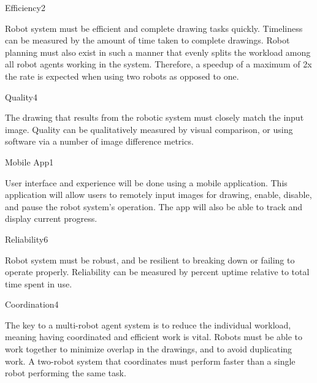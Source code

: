 \begin{nonfunctional_requirement}{Efficiency}{2}
\label{nfr:efficiency}
\item Robot system must be efficient and complete drawing tasks quickly. Timeliness can be measured by the amount of time taken to complete drawings. Robot planning must also exist in such a manner that evenly splits the workload among all robot agents working in the system. Therefore, a speedup of a maximum of 2x the rate is expected when using two robots as opposed to one. 
\end{nonfunctional_requirement}

\begin{nonfunctional_requirement}{Quality}{4}
\label{nfr:quality}
\item The drawing that results from the robotic system must closely match the input image. Quality can be qualitatively measured by visual comparison, or using software via a number of image difference metrics.
\end{nonfunctional_requirement}

\begin{nonfunctional_requirement}{Mobile App}{1}
\label{nfr:mobileapp}
\item User interface and experience will be done using a mobile application. This application will allow users to remotely input images for drawing, enable, disable, and pause the robot system's operation. The app will also be able to track and display current progress.
\end{nonfunctional_requirement}

\begin{nonfunctional_requirement}{Reliability}{6}
\label{nfr:reliability}
\item Robot system must be robust, and be resilient to breaking down or failing to operate properly. Reliability can be measured by percent uptime relative to total time spent in use.
\end{nonfunctional_requirement}


\begin{nonfunctional_requirement}{Coordination}{4}
\label{nfr:coordination}
\item The key to a multi-robot agent system is to reduce the individual workload, meaning having coordinated and efficient work is vital. Robots must be able to work together to minimize overlap in the drawings, and to avoid duplicating work. A two-robot system that coordinates must perform faster than a single robot performing the same task.
\end{nonfunctional_requirement}


